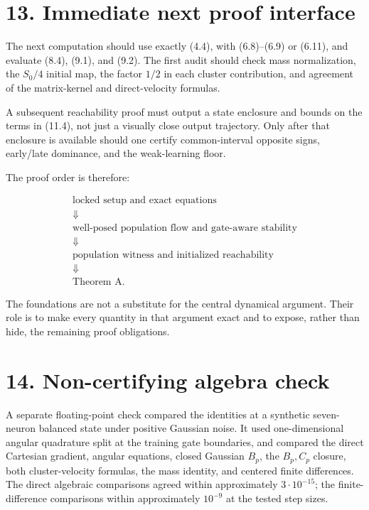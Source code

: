 \documentclass[
  10pt,
]{article}
\begin{document}
\section{13. Immediate next proof
interface}\label{immediate-next-proof-interface}

The next computation should use exactly (4.4), with (6.8)--(6.9) or
(6.11), and evaluate (8.4), (9.1), and (9.2). The first audit should
check mass normalization, the \(S_0/4\) initial map, the factor \(1/2\)
in each cluster contribution, and agreement of the matrix-kernel and
direct-velocity formulas.

A subsequent reachability proof must output a state enclosure and bounds
on the terms in (11.4), not just a visually close output trajectory.
Only after that enclosure is available should one certify
common-interval opposite signs, early/late dominance, and the
weak-learning floor.

The proof order is therefore:

\[
 \begin{gathered}
 \text{locked setup and exact equations}\\
 \Downarrow\\
 \text{well-posed population flow and gate-aware stability}\\
 \Downarrow\\
 \text{population witness and initialized reachability}\\
 \Downarrow\\
 \text{Theorem A}.
 \end{gathered}
\]

The foundations are not a substitute for the central dynamical argument.
Their role is to make every quantity in that argument exact and to
expose, rather than hide, the remaining proof obligations.

\section{14. Non-certifying algebra
check}\label{non-certifying-algebra-check}

A separate floating-point check compared the identities at a synthetic
seven-neuron balanced state under positive Gaussian noise. It used
one-dimensional angular quadrature split at the training gate
boundaries, and compared the direct Cartesian gradient, angular
equations, closed Gaussian \(B_p\), the \(B_p,C_p\) closure, both
cluster-velocity formulas, the mass identity, and centered finite
differences. The direct algebraic comparisons agreed within
approximately \(3\cdot10^{-15}\); the finite-difference comparisons
within approximately \(10^{-9}\) at the tested step sizes.
\end{document}
